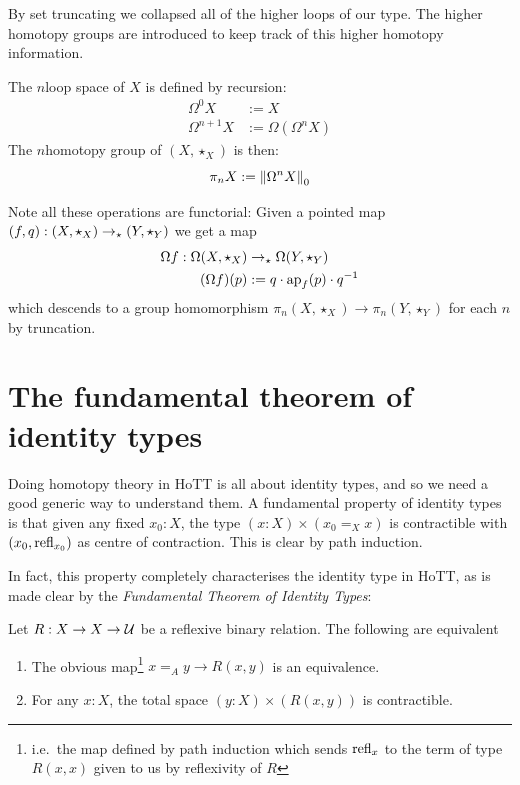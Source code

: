 \documentclass[10pt,oneside,leqno,openright]{memoir}
\begin{document}
By set truncating we collapsed all of the higher loops of our type.
The higher homotopy groups are introduced to keep track of this higher homotopy information.

\begin{definition}
    The $n$\th loop space of $X$ is defined by recursion:
    \begin{align*}
        \Omega^0X &:= X \\
        \Omega^{n+1}X &:= \Omega(\Omega^{n}X)
    \end{align*}
    The $n$\th homotopy group of $(X, \star_X)$ is then:
    \[ \pi_n X := {\lVert\Omega^n X\rVert}_0\]
\end{definition}

Note all these operations are functorial: Given a pointed map $(f,q) : (X, \star_X) \to_\star (Y, \star_Y)$ we get a map
\begin{align*}
    \Omega f : \Omega(X, \star_X) &\to_\star \Omega(Y, \star_Y)  \\
    (\Omega f)(p)& := q\cdot \operatorname{ap}_f(p)\cdot q^{-1}
\end{align*}
which descends to a group homomorphism $\pi_n(X, \star_X) \to \pi_n(Y, \star_Y)$ for each $n$ by truncation.

\section{The fundamental theorem of identity types}

Doing homotopy theory in HoTT is all about identity types, and so we need a good generic way to understand them.
A fundamental property of identity types is that given any fixed $x_0 : X$, the type $(x : X) \times (x_0 =_X x)$ is contractible with $(x_0, \mathrm{refl}_{x_0})$ as centre of contraction.
This is clear by path induction.

In fact, this property completely characterises the identity type in HoTT, as is made clear by the \emph{Fundamental Theorem of Identity Types}:
%
\begin{theorem}
    Let $R : X \to X \to \mathcal{U}$ be a reflexive binary relation. The following are equivalent   \begin{enumerate}
        \item The obvious map\footnote{i.e.\ the map defined by path induction which
          sends $\mathrm{refl}_x$ to the term of type $R(x,x)$ given to us by
          reflexivity of $R$} $x =_A y \to R(x,y)$  is an equivalence.
        \item For any $x :X$, the total space $(y : X) \times (R(x ,y))$ is contractible.
    \end{enumerate}
\end{theorem}
\end{document}
